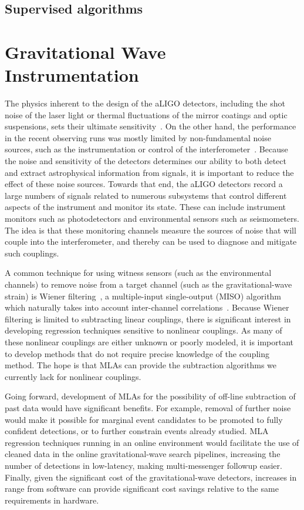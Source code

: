 \documentclass[letterpaper, aps, prd, superscriptaddress, showpacs, nofootinbib]{revtex4}
\begin{document}
\subsection{Supervised algorithms}

\section{Gravitational Wave Instrumentation}
\label{sec:gw_inst}


The physics inherent to the design of the aLIGO detectors, including the shot noise of the laser light or thermal fluctuations of the mirror coatings and optic suspensions, sets their ultimate sensitivity~\citep{aLIGO}. On the other hand, the performance in the recent observing runs was mostly limited by non-fundamental noise sources, such as the instrumentation or control of the interferometer~\citep{AbEA2016g}.
Because the noise and sensitivity of the detectors determines our ability to both detect and extract astrophysical information from signals, it is important to reduce the effect of these noise sources.
Towards that end, the aLIGO detectors record a large numbers of signals related to numerous subsystems that control different aspects of the instrument and monitor its state. These can include instrument monitors such as photodetectors and environmental sensors such as seismometers.
The idea is that these monitoring channels measure the sources of noise that will couple into the interferometer, and thereby can be used to diagnose and mitigate such couplings.

A common technique for using witness sensors (such as the environmental channels) to remove noise from a target channel (such as the gravitational-wave strain) is Wiener filtering~\citep{Vas2001,Say2003}, a multiple-input single-output (MISO) algorithm which naturally takes into account inter-channel correlations~\citep{DeEA2012,CoMu2016}.
Because Wiener filtering is limited to subtracting linear couplings, there is significant interest in developing regression techniques sensitive to nonlinear couplings. 
As many of these nonlinear couplings are either unknown or poorly modeled, it is important to develop methods that do not require precise knowledge of the coupling method.
The hope is that MLAs can provide the subtraction algorithms we currently lack for nonlinear couplings.

Going forward, development of MLAs for the possibility of off-line subtraction of past data would have significant benefits. 
For example, removal of further noise would make it possible for marginal event candidates to be promoted to fully confident detections, or to further constrain events already studied.
MLA regression techniques running in an online environment would facilitate the use of cleaned data in the online gravitational-wave search pipelines, increasing the number of detections in low-latency, making multi-messenger followup easier.
Finally, given the significant cost of the gravitational-wave detectors, increases in range from software can provide significant cost savings relative to the same requirements in hardware.
\end{document}
